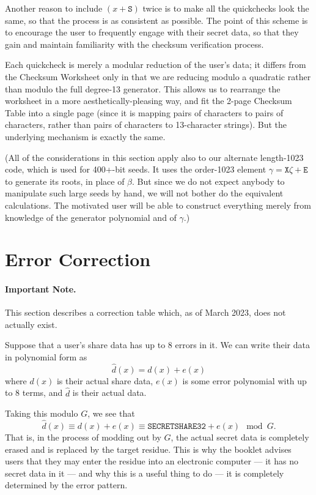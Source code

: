 \documentclass[letterpaper]{article}
\newcommand{\vc}[1]{\texttt{#1}} %
\begin{document}
Another reason to include $(x+\vc{S})$ twice is to make all the quickchecks look
the same, so that the process is as consistent as possible. The point of this
scheme is to encourage the user to frequently engage with their secret data, so
that they gain and maintain familiarity with the checksum verification process.

Each quickcheck is merely a modular reduction of the user's data; it differs
from the Checksum Worksheet only in that we are reducing modulo a quadratic
rather than modulo the full degree-13 generator. This allows us to rearrange
the worksheet in a more aesthetically-pleasing way, and fit the 2-page Checksum
Table into a single page (since it is mapping pairs of characters to pairs of
characters, rather than pairs of characters to 13-character strings). But the
underlying mechanism is exactly the same.

(All of the considerations in this section apply also to our alternate length-1023
code, which is used for 400+-bit seeds. It uses the order-1023 element
$\gamma=\vc{X}\zeta+\vc{E}$ to generate its roots, in place of $\beta$. But since
we do not expect anybody to manipulate such large seeds by hand, we will not
bother do the equivalent calculations. The motivated user will be able to construct
everything merely from knowledge of the generator polynomial and of $\gamma$.)

\section{Error Correction}

\paragraph{Important Note.} {\color{BrickRed}This section describes a correction
table which, as of March 2023, does not actually exist.}

Suppose that a user's share data has up to 8 errors in it. We can write their data
in polynomial form as
\[ \hat{d}(x) = d(x) + e(x) \]
where $d(x)$ is their actual share data, $e(x)$ is some error polynomial with up
to 8 terms, and $\hat{d}$ is their actual data.

Taking this modulo $G$, we see that
\[ \hat{d}(x) \equiv d(x) + e(x) \equiv \vc{SECRETSHARE32} + e(x) \mod G. \]
That is, in the process of modding out by $G$, the actual secret data is completely
erased and is replaced by the target residue. This is why the booklet advises users
that they may enter the residue into an electronic computer --- it has no secret
data in it --- and why this is a useful thing to do --- it is completely determined
by the error pattern.
\end{document}
